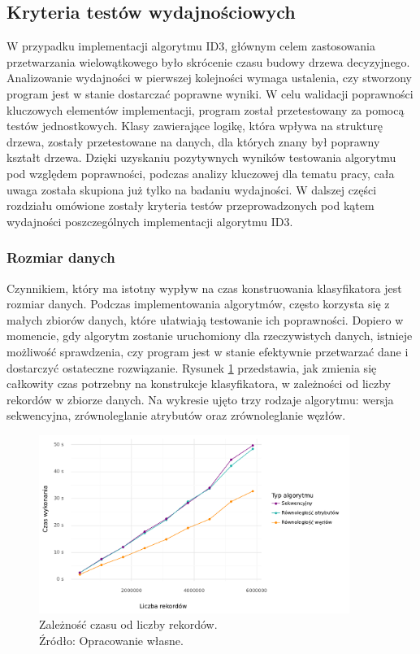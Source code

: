 \documentclass[12pt]{article}
\begin{document}
\subsection{Kryteria testów wydajnościowych}

W przypadku implementacji algorytmu ID3, głównym celem zastosowania przetwarzania wielowątkowego było
skrócenie czasu budowy drzewa decyzyjnego. Analizowanie wydajności w pierwszej kolejności wymaga ustalenia, czy stworzony
program jest w stanie dostarczać poprawne wyniki.
W celu walidacji poprawności kluczowych elementów implementacji, program został przetestowany za
pomocą testów jednostkowych. Klasy zawierające logikę, która wpływa na strukturę drzewa, zostały przetestowane
na danych, dla których znany był poprawny kształt drzewa. Dzięki uzyskaniu pozytywnych wyników
testowania algorytmu pod względem poprawności, podczas analizy kluczowej dla tematu pracy, cała
uwaga została skupiona już tylko na badaniu wydajności.
W dalszej części rozdziału omówione zostały kryteria testów przeprowadzonych pod kątem wydajności
poszczególnych implementacji algorytmu ID3.

\subsubsection{Rozmiar danych}
Czynnikiem, który ma istotny wypływ na czas konstruowania klasyfikatora jest rozmiar
danych. Podczas implementowania algorytmów, często korzysta się z małych zbiorów danych,
które ułatwiają testowanie ich poprawności. Dopiero w momencie, gdy algorytm zostanie
uruchomiony dla rzeczywistych danych, istnieje możliwość sprawdzenia, czy program jest w stanie
efektywnie przetwarzać dane i dostarczyć ostateczne rozwiązanie. 
Rysunek \ref{fig:analysis} przedstawia, jak zmienia się całkowity czas potrzebny na konstrukcje
klasyfikatora, w zależności od liczby rekordów w zbiorze danych. Na wykresie ujęto trzy rodzaje algorytmu:
wersja sekwencyjna, zrównoleglanie atrybutów oraz zrównoleglanie węzłów.

\begin{figure}[H]
    \centering
	\includegraphics[width=0.9\textwidth]{analysis.pdf}
    \caption{Zależność czasu od liczby rekordów.\\Źródło: Opracowanie własne.}
    \label{fig:analysis}
\end{figure}
\end{document}
